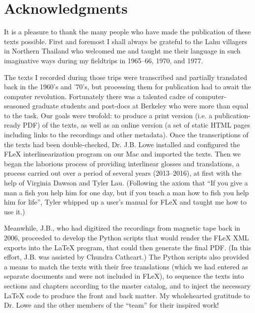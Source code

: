 \vspace{0.25em}

\renewcommand{\thefootnote}{\arabic{footnote}}
\setcounter{footnote}{0}

\section*{Acknowledgments}
It is a pleasure to thank the many people who have made the publication
of these texts possible. First and foremost I shall always be grateful
to the Lahu villagers in Northern Thailand who welcomed me and taught me
their language in such imaginative ways during my fieldtrips in 1965--66,
1970, and 1977.

The texts I recorded during those trips were transcribed and partially
translated back in the 1960's and '70's, but processing them for
publication had to await the computer revolution. Fortunately there
was a talented cadre of computer-seasoned graduate students and
post-docs at Berkeley who were more than equal to the task. Our goals
were twofold: to produce a print version (i.e. a publication-ready PDF) of
the texts, as well as an online version (a set of static HTML pages
including links to the recordings and other metadata). Once the
transcriptions of the texts had been double-checked, Dr. J.B. Lowe
installed and configured the FLeX interlinearization program on our Mac
and imported the texts. Then we began the laborious process of providing
interlinear glosses and translations, a process
carried out over a period of several years (2013--2016), at first with
the help of Virginia Dawson and Tyler Lau.  (Following the axiom that
``If you give a man a fish you help him for one day, but if you teach
a man how to fish you help him for life'', Tyler whipped up a user's
manual for FLeX and taught me how to use it.)

Meanwhile, J.B., who had digitized the recordings from magnetic tape back in 2006,
proceeded to develop the Python scripts that would render the FLeX XML
exports into the LaTeX program, that could then generate the
final PDF. (In this effort, J.B. was assisted by Chundra
Cathcart.) The Python scripts also provided a means to match the texts
with their free translations (which we had entered as separate documents and were not included
in FLeX), to sequence the texts into sections and chapters according to
the master catalog, and to inject the necessary LaTeX code to produce
the front and back matter. My wholehearted gratitude to Dr. Lowe and the
other members of the ``team'' for their inspired work!

